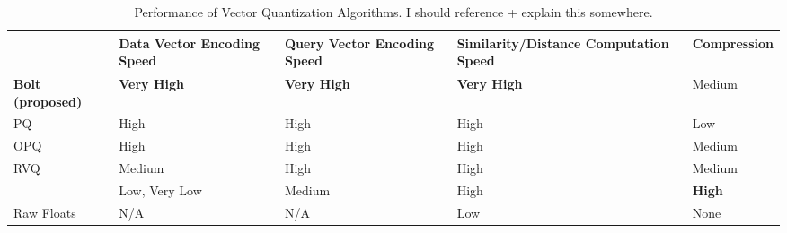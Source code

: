 \begin{table*}[t]
  \caption{Performance of Vector Quantization Algorithms. I should reference + explain this somewhere.}
  \label{tab:table1}
  \large

  \def\arraystretch{1.1}%
  \begin{tabularx}{\linewidth}{X|YYYY}
\toprule
    & \hspace{1mm} Data Vector \hphantom{ } Encoding Speed & Query Vector Encoding Speed & Similarity/Distance Computation Speed & \vspace{.5mm} Compression \\
\hline
    \textbf{Bolt (proposed)} & \textbf{Very High} & \textbf{Very High} & \textbf{Very High} & Medium \\
    PQ  & High & High & High & Low \\
    OPQ & High & High & High & Medium \\
    RVQ & Medium & High & High & Medium \\
     & Low, Very Low & Medium & High & \textbf{High} \\
    Raw Floats & N/A & N/A & Low & None \\


\end{tabularx}
\end{table*}
